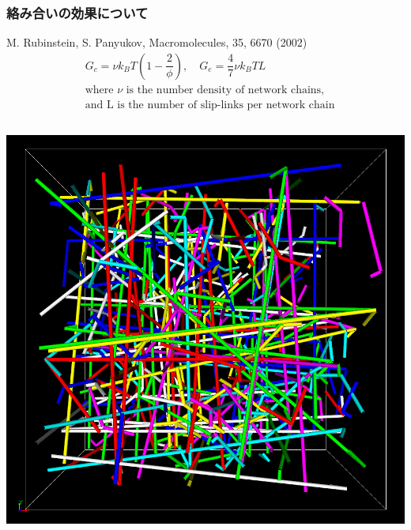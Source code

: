 \documentclass[12pt, dvipdfmx]{beamer}
\begin{document}
\begin{frame}
    \frametitle{絡み合いの効果について}
	\footnotesize
		M. Rubinstein, S. Panyukov, Macromolecules, 35, 6670 (2002)
			\begin{align*}
				&G_c = \nu k_B T \left(1-\dfrac{2}{\phi} \right), \quad G_e = \dfrac{4}{7} \nu k_B T L \\
				&\text{where $\nu$ is the number density of network chains,} \\
				& \text{and L is the number of slip-links per network chain}
			\end{align*}
		\vspace{-10mm}
		\begin{columns}[c, onlytextwidth]
				\vspace{-3mm}
				\begin{center}
					\includegraphics[width=.9\textwidth]{z_cord_NPT_4Chain.png}


\end{center}
\end{columns}
\end{frame}
\end{document}

